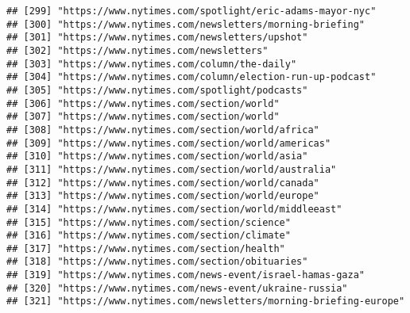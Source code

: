 \documentclass[
]{article}
\begin{document}
\begin{verbatim}
## [299] "https://www.nytimes.com/spotlight/eric-adams-mayor-nyc"                                                    
## [300] "https://www.nytimes.com/newsletters/morning-briefing"                                                      
## [301] "https://www.nytimes.com/newsletters/upshot"                                                                
## [302] "https://www.nytimes.com/newsletters"                                                                       
## [303] "https://www.nytimes.com/column/the-daily"                                                                  
## [304] "https://www.nytimes.com/column/election-run-up-podcast"                                                    
## [305] "https://www.nytimes.com/spotlight/podcasts"                                                                
## [306] "https://www.nytimes.com/section/world"                                                                     
## [307] "https://www.nytimes.com/section/world"                                                                     
## [308] "https://www.nytimes.com/section/world/africa"                                                              
## [309] "https://www.nytimes.com/section/world/americas"                                                            
## [310] "https://www.nytimes.com/section/world/asia"                                                                
## [311] "https://www.nytimes.com/section/world/australia"                                                           
## [312] "https://www.nytimes.com/section/world/canada"                                                              
## [313] "https://www.nytimes.com/section/world/europe"                                                              
## [314] "https://www.nytimes.com/section/world/middleeast"                                                          
## [315] "https://www.nytimes.com/section/science"                                                                   
## [316] "https://www.nytimes.com/section/climate"                                                                   
## [317] "https://www.nytimes.com/section/health"                                                                    
## [318] "https://www.nytimes.com/section/obituaries"                                                                
## [319] "https://www.nytimes.com/news-event/israel-hamas-gaza"                                                      
## [320] "https://www.nytimes.com/news-event/ukraine-russia"                                                         
## [321] "https://www.nytimes.com/newsletters/morning-briefing-europe"                                               

\end{verbatim}
\end{document}
